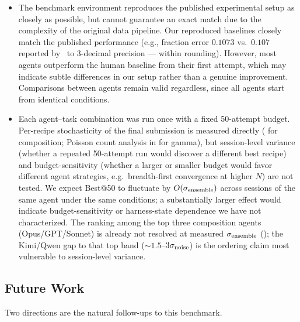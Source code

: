 \documentclass[universe,article,submit,pdftex,oneauthor]{Definitions/mdpi}
\begin{document}
\begin{itemize}
    \item The benchmark environment reproduces the published experimental setup as closely as possible, but cannot guarantee an exact match due to the complexity of the original data pipeline. Our reproduced baselines closely match the published performance (e.g., fraction error $0.1073$ vs.\ $0.107$ reported by~\cite{kascade_jinst} to 3-decimal precision --- within rounding). However, most agents outperform the human baseline from their first attempt, which may indicate subtle differences in our setup rather than a genuine improvement. Comparisons between agents remain valid regardless, since all agents start from identical conditions.
    \item Each agent--task combination was run once with a fixed 50-attempt budget. Per-recipe stochasticity of the final submission is measured directly ( for composition; Poisson count analysis in  for gamma), but session-level variance (whether a repeated 50-attempt run would discover a different best recipe) and budget-sensitivity (whether a larger or smaller budget would favor different agent strategies, e.g.\ breadth-first convergence at higher $N$) are not tested. We expect Best@50 to fluctuate by $O(\sigma_{\rm ensemble})$ across sessions of the same agent under the same conditions; a substantially larger effect would indicate budget-sensitivity or harness-state dependence we have not characterized. The ranking among the top three composition agents (Opus/GPT/Sonnet) is already not resolved at measured $\sigma_{\rm ensemble}$ (); the Kimi/Qwen gap to that top band (${\sim}1.5$--$3\sigma_{\rm noise}$) is the ordering claim most vulnerable to session-level variance.
\end{itemize}

\subsection{Future Work}
\label{sec:future_work}

Two directions are the natural follow-ups to this benchmark.
\end{document}
